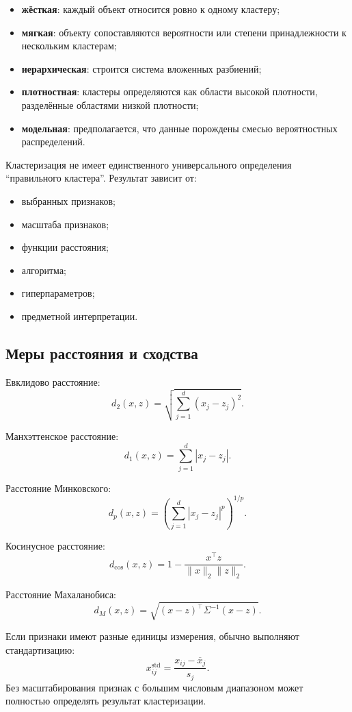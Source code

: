 \documentclass[12pt,a4paper]{article}
\theoremstyle{definition}
\theoremstyle{remark}
\begin{document}
\begin{itemize}
    \item \textbf{жёсткая}: каждый объект относится ровно к одному кластеру;
    \item \textbf{мягкая}: объекту сопоставляются вероятности или степени
          принадлежности к нескольким кластерам;
    \item \textbf{иерархическая}: строится система вложенных разбиений;
    \item \textbf{плотностная}: кластеры определяются как области высокой
          плотности, разделённые областями низкой плотности;
    \item \textbf{модельная}: предполагается, что данные порождены смесью
          вероятностных распределений.
\end{itemize}

Кластеризация не имеет единственного универсального определения
``правильного кластера''. Результат зависит от:

\begin{itemize}
    \item выбранных признаков;
    \item масштаба признаков;
    \item функции расстояния;
    \item алгоритма;
    \item гиперпараметров;
    \item предметной интерпретации.
\end{itemize}

\subsection{Меры расстояния и сходства}

Евклидово расстояние:
\[
    d_2(x,z)
    =
    \sqrt{
        \sum_{j=1}^{d}(x_j-z_j)^2
    }.
\]

Манхэттенское расстояние:
\[
    d_1(x,z)
    =
    \sum_{j=1}^{d}|x_j-z_j|.
\]

Расстояние Минковского:
\[
    d_p(x,z)
    =
    \left(
        \sum_{j=1}^{d}|x_j-z_j|^p
    \right)^{1/p}.
\]

Косинусное расстояние:
\[
    d_{\cos}(x,z)
    =
    1-
    \frac{x^\top z}{\|x\|_2\|z\|_2}.
\]

Расстояние Махаланобиса:
\[
    d_M(x,z)
    =
    \sqrt{
        (x-z)^\top\Sigma^{-1}(x-z)
    }.
\]

Если признаки имеют разные единицы измерения, обычно выполняют
стандартизацию:
\[
    x_{ij}^{\mathrm{std}}
    =
    \frac{x_{ij}-\overline x_j}{s_j}.
\]
Без масштабирования признак с большим числовым диапазоном может полностью
определять результат кластеризации.
\end{document}
